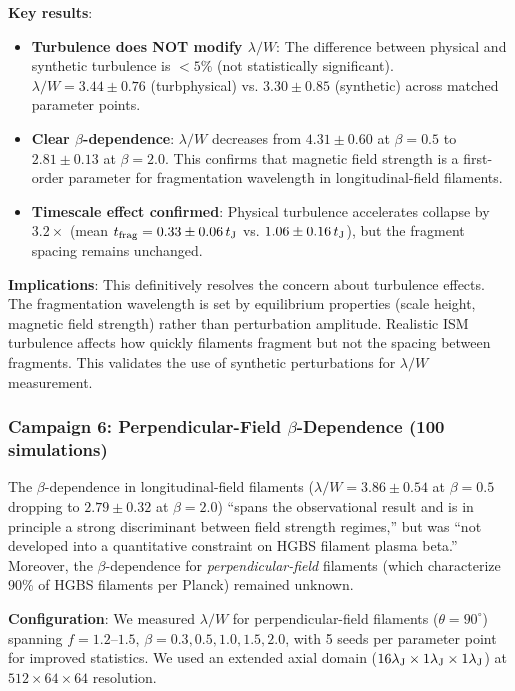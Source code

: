\documentclass[twocolumn]{mnras}
\begin{document}
\textbf{Key results}:
\begin{itemize}
    \item \textbf{Turbulence does NOT modify $\lambda/W$}: The difference between physical and synthetic turbulence is $<5\%$ (not statistically significant). $\lambda/W = 3.44 \pm 0.76$ (turbphysical) vs. $3.30 \pm 0.85$ (synthetic) across matched parameter points.
    \item \textbf{Clear $\beta$-dependence}: $\lambda/W$ decreases from $4.31 \pm 0.60$ at $\beta = 0.5$ to $2.81 \pm 0.13$ at $\beta = 2.0$. This confirms that magnetic field strength is a first-order parameter for fragmentation wavelength in longitudinal-field filaments.
    \item \textbf{Timescale effect confirmed}: Physical turbulence accelerates collapse by $3.2\times$ (mean $t_{\rm frag} = 0.33 \pm 0.06\,t_{\rm J}$ vs. $1.06 \pm 0.16\,t_{\rm J}$), but the fragment spacing remains unchanged.
\end{itemize}

\textbf{Implications}: This definitively resolves the concern about turbulence effects. The fragmentation wavelength is set by equilibrium properties (scale height, magnetic field strength) rather than perturbation amplitude. Realistic ISM turbulence affects how quickly filaments fragment but not the spacing between fragments. This validates the use of synthetic perturbations for $\lambda/W$ measurement.

\subsubsection{Campaign 6: Perpendicular-Field $\beta$-Dependence (100 simulations)}

The $\beta$-dependence in longitudinal-field filaments ($\lambda/W = 3.86 \pm 0.54$ at $\beta = 0.5$ dropping to $2.79 \pm 0.32$ at $\beta = 2.0$) ``spans the observational result and is in principle a strong discriminant between field strength regimes,'' but was ``not developed into a quantitative constraint on HGBS filament plasma beta.'' Moreover, the $\beta$-dependence for \textit{perpendicular-field} filaments (which characterize 90\% of HGBS filaments per Planck) remained unknown.

\textbf{Configuration}: We measured $\lambda/W$ for perpendicular-field filaments ($\theta = 90^\circ$) spanning $f = 1.2$--$1.5$, $\beta = 0.3, 0.5, 1.0, 1.5, 2.0$, with 5 seeds per parameter point for improved statistics. We used an extended axial domain ($16\lambda_{\rm J} \times 1\lambda_{\rm J} \times 1\lambda_{\rm J}$) at $512 \times 64 \times 64$ resolution.
\end{document}
